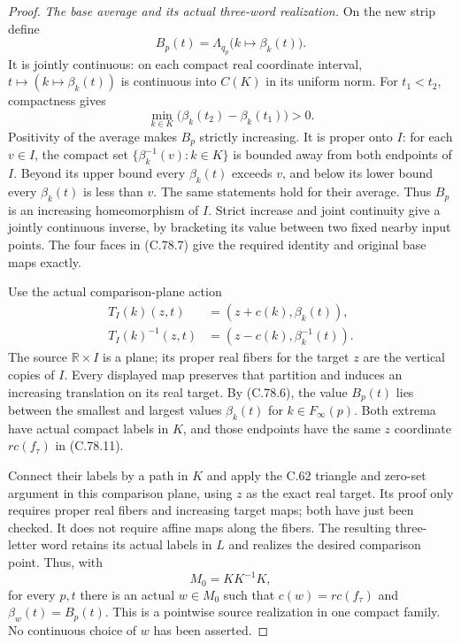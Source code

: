 \begin{proof}
\emph{The base average and its actual three-word realization.}
On the new strip define
\[
                B_p(t)=\Lambda_{q_p}\bigl(k\mapsto\beta_k(t)\bigr).
                                                               \tag{C.78.9}
\]
It is jointly continuous: on each compact real
coordinate interval, $t\mapsto(k\mapsto\beta_k(t))$
is continuous into $C(K)$ in its uniform norm.
For $t_1<t_2$, compactness gives
\[
       \min_{k\in K}\bigl(\beta_k(t_2)-\beta_k(t_1)\bigr)>0.
                                                               \tag{C.78.10}
\]
Positivity of the average makes $B_p$ strictly
increasing. It is proper onto $I$: for each
$v\in I$, the compact set
$\{\beta_k^{-1}(v):k\in K\}$ is bounded away
from both endpoints of $I$. Beyond its upper
bound every $\beta_k(t)$ exceeds $v$, and below
its lower bound every $\beta_k(t)$ is less than
$v$. The same statements hold for their average.
Thus $B_p$ is an increasing homeomorphism of $I$.
Strict increase and joint continuity give a
jointly continuous inverse, by bracketing its
value between two fixed nearby input points.
The four faces in (C.78.7) give the required
identity and original base maps exactly.

Use the actual comparison-plane action
\[
       \begin{split}
       T_I(k)(z,t)&=(z+c(k),\beta_k(t)),\\
       T_I(k)^{-1}(z,t)&=(z-c(k),\beta_k^{-1}(t)).
       \end{split}
                                                               \tag{C.78.11}
\]
The source $\mathbb R\times I$ is a plane; its
proper real fibers for the target $z$ are the
vertical copies of $I$. Every displayed map
preserves that partition and induces an increasing
translation on its real target. By (C.78.6), the
value $B_p(t)$ lies between the smallest and
largest values $\beta_k(t)$ for $k\in F_\infty(p)$.
Both extrema have actual compact labels in $K$,
and those endpoints have the same $z$ coordinate
$r c(f_\tau)$ in (C.78.11).

Connect their labels by a path in $K$ and apply
the C.62 triangle and zero-set argument in this
comparison plane, using $z$ as the exact real
target. Its proof only requires proper real
fibers and increasing target maps; both have
just been checked. It does not require affine
maps along the fibers. The resulting three-letter
word retains its actual labels in $L$ and realizes
the desired comparison point. Thus, with
\[
                     M_0=K K^{-1}K,
                                                               \tag{C.78.12}
\]
for every $p,t$ there is an actual $w\in M_0$
such that $c(w)=r c(f_\tau)$ and
$\beta_w(t)=B_p(t)$. This is a pointwise source
realization in one compact family. No continuous
choice of $w$ has been asserted.


\end{proof}
